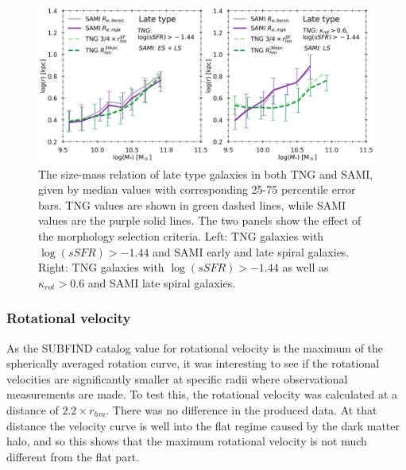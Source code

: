 \begin{figure}
    \centering
    \includegraphics[width=\textwidth]{images/SM_R_lates.png}
    \caption{The size-mass relation of late type galaxies in both TNG and SAMI, given by median values with corresponding 25-75 percentile error bars. TNG values are shown in green dashed lines, while SAMI values are the purple solid lines. The two panels show the effect of the morphology selection criteria. Left: TNG galaxies with $\log(sSFR) > -1.44$ and SAMI early and late spiral galaxies. Right: TNG galaxies with $\log(sSFR) > -1.44$ as well as $\kappa_{rot} > 0.6$ and SAMI late spiral galaxies.}
    \label{SM_R_lates}
\end{figure}

\subsubsection{Rotational velocity}
As the SUBFIND catalog value for rotational velocity is the maximum of the spherically averaged rotation curve, it was interesting to see if the rotational velocities are significantly smaller at specific radii where observational measurements are made. To test this, the rotational velocity was calculated at a distance of $2.2 \times r_{hm}$. There was no difference in the produced data. At that distance the velocity curve is well into the flat regime caused by the dark matter halo, and so this shows that the maximum rotational velocity is not much different from the flat part.

